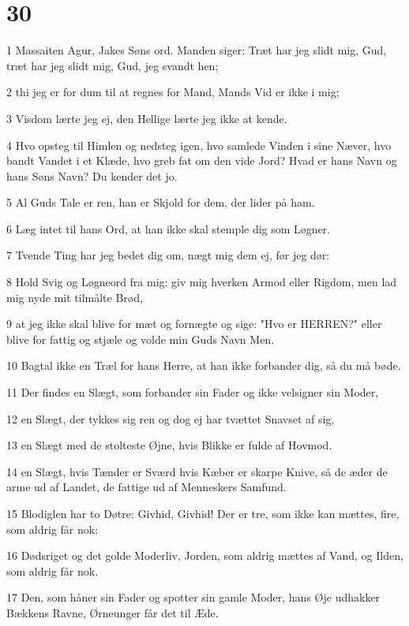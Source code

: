 \chapter{30}

\par 1 Massaiten Agur, Jakes Søns ord. Manden siger: Træt har jeg slidt mig, Gud, træt har jeg slidt mig, Gud, jeg svandt hen;
\par 2 thi jeg er for dum til at regnes for Mand, Mands Vid er ikke i mig;
\par 3 Visdom lærte jeg ej, den Hellige lærte jeg ikke at kende.
\par 4 Hvo opsteg til Himlen og nedsteg igen, hvo samlede Vinden i sine Næver, hvo bandt Vandet i et Klæde, hvo greb fat om den vide Jord? Hvad er hans Navn og hans Søns Navn? Du kender det jo.
\par 5 Al Guds Tale er ren, han er Skjold for dem, der lider på ham.
\par 6 Læg intet til hans Ord, at han ikke skal stemple dig som Løgner.
\par 7 Tvende Ting har jeg bedet dig om, nægt mig dem ej, før jeg dør:
\par 8 Hold Svig og Løgneord fra mig: giv mig hverken Armod eller Rigdom, men lad mig nyde mit tilmålte Brød,
\par 9 at jeg ikke skal blive for mæt og fornægte og sige: "Hvo er HERREN?" eller blive for fattig og stjæle og volde min Guds Navn Men.
\par 10 Bagtal ikke en Træl for hans Herre, at han ikke forbander dig, så du må bøde.
\par 11 Der findes en Slægt, som forbander sin Fader og ikke velsigner sin Moder,
\par 12 en Slægt, der tykkes sig ren og dog ej har tvættet Snavset af sig,
\par 13 en Slægt med de stolteste Øjne, hvis Blikke er fulde af Hovmod.
\par 14 en Slægt, hvis Tænder er Sværd hvis Kæber er skarpe Knive, så de æder de arme ud af Landet, de fattige ud af Menneskers Samfund.
\par 15 Blodiglen har to Døtre: Givhid, Givhid! Der er tre, som ikke kan mættes, fire, som aldrig får nok:
\par 16 Dødsriget og det golde Moderliv, Jorden, som aldrig mættes af Vand, og Ilden, som aldrig får nok.
\par 17 Den, som håner sin Fader og spotter sin gamle Moder, hans Øje udhakker Bækkens Ravne, Ørneunger får det til Æde.

